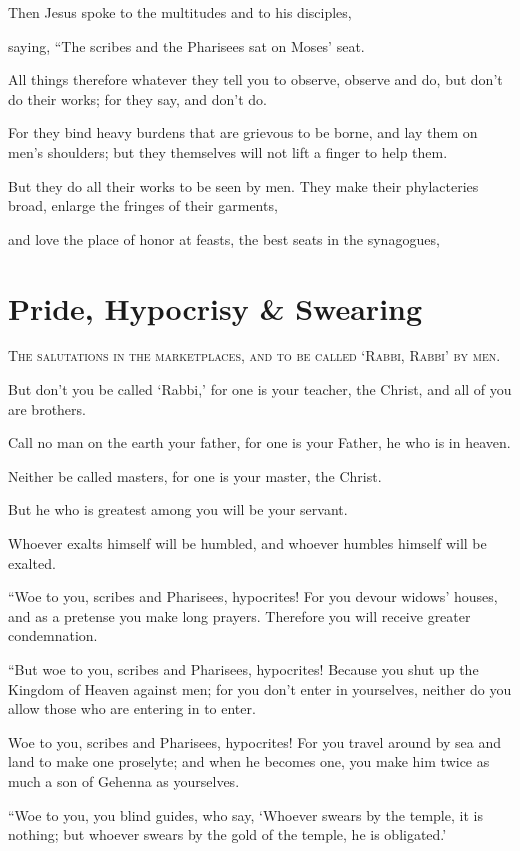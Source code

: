Then Jesus spoke to the multitudes and to his disciples,

saying, “The scribes and the Pharisees sat on Moses’ seat.

All things therefore whatever they tell you to observe, observe and do, but don’t do their works; for they say, and don’t do.

For they bind heavy burdens that are grievous to be borne, and lay them on men’s shoulders; but they themselves will not lift a finger to help them.

But they do all their works to be seen by men. They make their phylacteries  broad, enlarge the fringes of their garments,

and love the place of honor at feasts, the best seats in the synagogues,


\clearpage \section*{Pride, Hypocrisy \& Swearing}

\lettrine{T}{he salutations in the marketplaces, and to be called ‘Rabbi, Rabbi’ by men.}

But don’t you be called ‘Rabbi,’ for one is your teacher, the Christ, and all of you are brothers.

Call no man on the earth your father, for one is your Father, he who is in heaven.

Neither be called masters, for one is your master, the Christ.

But he who is greatest among you will be your servant.

Whoever exalts himself will be humbled, and whoever humbles himself will be exalted.

“Woe to you, scribes and Pharisees, hypocrites! For you devour widows’ houses, and as a pretense you make long prayers. Therefore you will receive greater condemnation.

“But woe to you, scribes and Pharisees, hypocrites! Because you shut up the Kingdom of Heaven against men; for you don’t enter in yourselves, neither do you allow those who are entering in to enter.

Woe to you, scribes and Pharisees, hypocrites! For you travel around by sea and land to make one proselyte; and when he becomes one, you make him twice as much a son of Gehenna as yourselves.

“Woe to you, you blind guides, who say, ‘Whoever swears by the temple, it is nothing; but whoever swears by the gold of the temple, he is obligated.’

